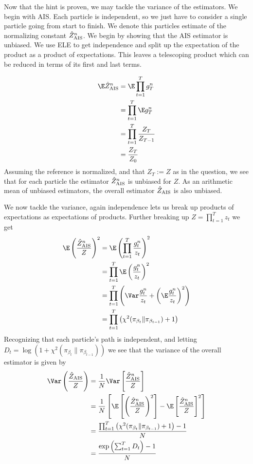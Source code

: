 \documentclass{article}
\begin{document}
\begin{enumerate}
    Now that the hint is proven, we may tackle the variance of the estimators.
    We begin with AIS. Each particle is independent, so we just have to consider
    a single particle going from start to finish. We denote this particles
    estimate of the normalizing constant $\hat Z^{n}_{\text{AIS}}$. We begin by showing that the
    AIS estimator is unbiased. We use ELE to get independence and split
    up the expectation of the product as a product of expectations. This leaves
    a telescoping product which can be reduced in terms of its first and
    last terms.

    \begin{align}
        \E \hat Z^n_{\AIS} &= 
            \E \prod_{t=1}^T g^n_T \\
        &= \prod_{t=1}^T \E g^n_T \\
        &= \prod_{t=1}^T \frac{Z_T}{Z_{T-1}} \\
        &= \frac{Z_T}{Z_0}
    \end{align}
    Assuming the reference is normalized, and that $Z_T := Z$ as in the
    question, we see that for each particle the estimator $\hat Z^n_{{\text{AIS}}}$
    is unbiased for $Z$. As an arithmetic mean of unbiased estimators, the overall 
    estimator $\hat Z_{\text{AIS}}$ is also unbiased.
    
    We now tackle the variance, again
    independence lets us break up products of expectations as expectations
    of products. Further breaking up $Z = \prod_{t=1}^T z_t$ we get
    \begin{align}
        \E \left(\frac{{\hat Z}^{n}_\AIS}{Z}\right)^2 &=
            \E \left(\prod_{t=1}^T \frac{g^n_t}{z_t} \right)^2 \\
            &= \prod_{t=1}^T \E\left({\frac{g_t^{n}}{z_t}}\right)^2 \\
            &= \prod_{t=1}^T \left(\Var \frac{g^n_t}{z_t} + \left(\E \frac{g^n_t}{z_t}\right)^2\right)\\
            &= \prod_{t=1}^T \left(\chi^2(\pi_{\beta_t}\| \pi_{\beta_{t-1}}) + 1 \right)
    \end{align}
    Recognizing that each particle's path is independent, and letting
    $D_t = \log\left(1+\chi^2(\pi_{\beta_t}\|\pi_{\beta_{t-1}})\right)$ we
    see that the variance of the overall estimator is given by 
    \begin{align}
        \Var \left(\frac{{\hat Z}_\AIS}{Z}\right) &= 
            \frac 1 N \Var\left[\frac{\hat Z^{n}_\AIS}{Z}\right] \\
            &= \frac 1 N \left[ \E \left[\left(\frac{\hat Z^{n}_\AIS}{Z}\right)^2\right] 
                - \E \left[ \frac{\hat Z^{n}_\AIS}{Z}\right]^2 \right] \\
            &= 
           \frac{\prod_{t=1}^T \left(\chi^2(\pi_{\beta_t}\| \pi_{\beta_{t-1}}) + 1 \right) - 1}{N}  \\
           &= \frac{\exp\left(\sum_{t=1}^T D_t\right) - 1}{N}
    \end{align}
    

\end{enumerate}
\end{document}
